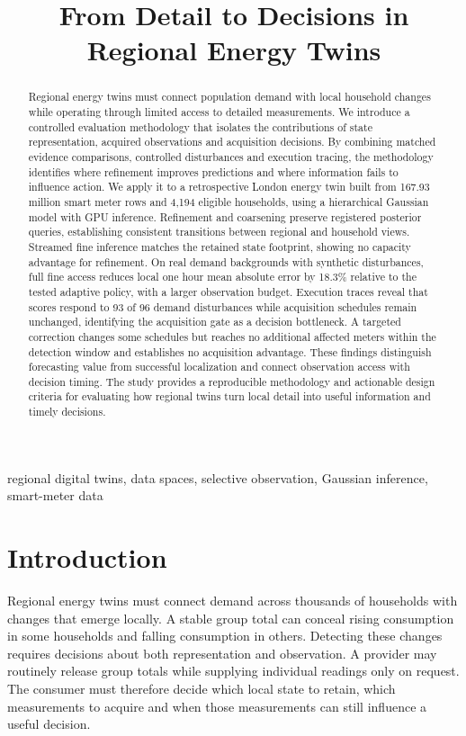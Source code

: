 \documentclass[conference]{IEEEtran}
\title{From Detail to Decisions in Regional Energy Twins}
\author{\IEEEauthorblockN{Alexander V. Mantzaris}
\IEEEauthorblockA{School of Data, Mathematical and Statistical Sciences\\
University of Central Florida\\
alexander.mantzaris@ucf.edu}}
\newcommand{\FineGainPercent}{18.3}
\begin{document}
\maketitle

\begin{abstract}
Regional energy twins must connect population demand with local household changes while operating through limited access to detailed measurements. We introduce a controlled evaluation methodology that isolates the contributions of state representation, acquired observations and acquisition decisions. By combining matched evidence comparisons, controlled disturbances and execution tracing, the methodology identifies where refinement improves predictions and where information fails to influence action. We apply it to a retrospective London energy twin built from 167.93 million smart meter rows and 4,194 eligible households, using a hierarchical Gaussian model with GPU inference. Refinement and coarsening preserve registered posterior queries, establishing consistent transitions between regional and household views. Streamed fine inference matches the retained state footprint, showing no capacity advantage for refinement. On real demand backgrounds with synthetic disturbances, full fine access reduces local one hour mean absolute error by \FineGainPercent{}\% relative to the tested adaptive policy, with a larger observation budget. Execution traces reveal that scores respond to 93 of 96 demand disturbances while acquisition schedules remain unchanged, identifying the acquisition gate as a decision bottleneck. A targeted correction changes some schedules but reaches no additional affected meters within the detection window and establishes no acquisition advantage. These findings distinguish forecasting value from successful localization and connect observation access with decision timing. The study provides a reproducible methodology and actionable design criteria for evaluating how regional twins turn local detail into useful information and timely decisions.
\end{abstract}
\begin{IEEEkeywords}
regional digital twins, data spaces, selective observation, Gaussian inference, smart-meter data
\end{IEEEkeywords}




\section{Introduction}
Regional energy twins must connect demand across thousands of households with changes that emerge locally. A stable group total can conceal rising consumption in some households and falling consumption in others. Detecting these changes requires decisions about both representation and observation. A provider may routinely release group totals while supplying individual readings only on request. The consumer must therefore decide which local state to retain, which measurements to acquire and when those measurements can still influence a useful decision.
\end{document}
